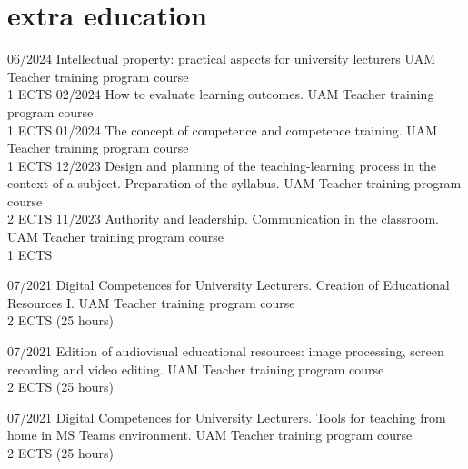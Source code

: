 \documentclass[]{friggeri-cv}
\begin{document}
\section{extra education}
\begin{entrylist}
\entry
    {06/2024}
    {Intellectual property: practical aspects for university lecturers}
    {UAM}
    {Teacher training program course\\
    1 ECTS
    }
\entry
    {02/2024}
    {How to evaluate learning outcomes.}
    {UAM}
    {Teacher training program course\\
    1 ECTS
    }
\entry
    {01/2024}
    {The concept of competence and competence training.}
    {UAM}
    {Teacher training program course\\
    1 ECTS
    }
\entry
    {12/2023}
    {Design and planning of the teaching-learning process in the context of a subject. Preparation of the syllabus.}
    {UAM}
    {Teacher training program course\\
    2 ECTS
    }
\entry
    {11/2023}
    {Authority and leadership. Communication in the classroom.}
    {UAM}
    {Teacher training program course\\
    1 ECTS
    }
    
\entry
    {07/2021}
    {Digital Competences for University Lecturers. Creation of Educational Resources I.}
    {UAM}
    {Teacher training program course\\
    2 ECTS (25 hours)
    }
    
\entry
    {07/2021}
    {Edition of audiovisual educational resources: image processing, screen recording and video editing.}
    {UAM}
    {Teacher training program course\\
    2 ECTS (25 hours)
    }

\entry
    {07/2021}
    {Digital Competences for University Lecturers. Tools for teaching from home in MS Teams environment.}
    {UAM}
    {Teacher training program course\\
    2 ECTS (25 hours)
    }
    

\end{entrylist}
\end{document}
